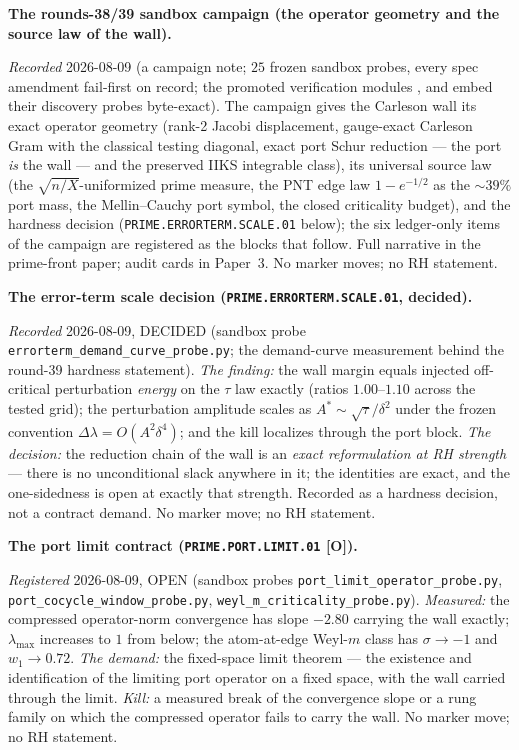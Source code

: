 \documentclass[11pt,a4paper]{article}
\begin{document}
\par\smallskip\noindent\textbf{The rounds-38/39 sandbox campaign
(the operator geometry and the source law of the wall).}
{\sloppy
\emph{Recorded} 2026-08-09 (a campaign note; $25$ frozen sandbox
probes, every spec amendment fail-first on record; the promoted
verification modules
,
 and
 embed their discovery probes
byte-exact).  The campaign gives the Carleson wall its exact
operator geometry (rank-2 Jacobi displacement, gauge-exact
Carleson Gram with the classical testing diagonal, exact port
Schur reduction --- the port \emph{is} the wall --- and the
preserved IIKS integrable class), its universal source law (the
$\sqrt{n/X}$-uniformized prime measure, the PNT edge law $1 -
e^{-1/2}$ as the ${\sim}39\%$ port mass, the Mellin--Cauchy port
symbol, the closed criticality budget), and the hardness decision
(\texttt{PRIME.ERRORTERM.SCALE.01} below); the six ledger-only
items of the campaign are registered as the blocks that follow.
Full narrative in the prime-front paper; audit cards in Paper~3.
No marker moves; no RH statement.\par}

\par\smallskip\noindent\textbf{The error-term scale decision
(\texttt{PRIME.ERRORTERM.\allowbreak SCALE.01}, decided).}
{\sloppy
\emph{Recorded} 2026-08-09, DECIDED (sandbox probe
\texttt{errorterm\_demand\_curve\_probe.py}; the demand-curve
measurement behind the round-39 hardness statement).  \emph{The
finding:} the wall margin equals injected off-critical
perturbation \emph{energy} on the $\tau$ law exactly (ratios
$1.00$--$1.10$ across the tested grid); the perturbation
amplitude scales as $A^{*} \sim \sqrt{\tau}/\delta^{2}$ under the
frozen convention $\Delta\lambda = O(A^{2}\delta^{4})$; and the
kill localizes through the port block.  \emph{The decision:} the
reduction chain of the wall is an \emph{exact reformulation at RH
strength} --- there is no unconditional slack anywhere in it; the
identities are exact, and the one-sidedness is open at exactly
that strength.  Recorded as a hardness decision, not a contract
demand.  No marker move; no RH statement.\par}

\par\smallskip\noindent\textbf{The port limit contract
(\texttt{PRIME.PORT.\allowbreak LIMIT.01} [O]).}
{\sloppy
\emph{Registered} 2026-08-09, OPEN (sandbox probes
\texttt{port\_limit\_operator\_probe.py},
\texttt{port\_cocycle\_window\_probe.py},
\texttt{weyl\_m\_criticality\_probe.py}).  \emph{Measured:} the
compressed operator-norm convergence has slope $-2.80$ carrying
the wall exactly; $\lambda_{\max}$ increases to $1$ from below;
the atom-at-edge Weyl-$m$ class has $\sigma \to -1$ and $w_1 \to
0.72$.  \emph{The demand:} the fixed-space limit theorem --- the
existence and identification of the limiting port operator on a
fixed space, with the wall carried through the limit.
\emph{Kill:} a measured break of the convergence slope or a rung
family on which the compressed operator fails to carry the wall.
No marker move; no RH statement.\par}
\end{document}
